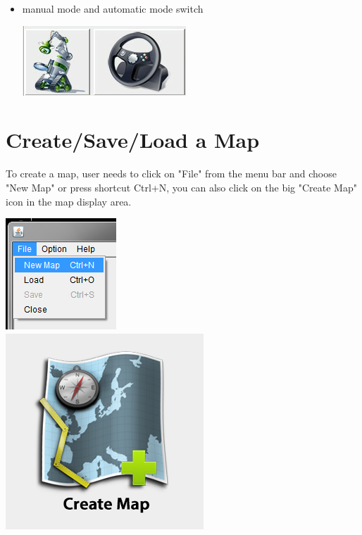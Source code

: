 \documentclass[11pt, a4paper]{report}
\begin{document}
\begin{itemize}
\begin{center}
	\end{center}
	\item manual mode and automatic mode switch
	\begin{center}
	\includegraphics[scale=0.7]{./image/Switch.png}\\[1cm]
	\end{center}
\end{itemize}

\section{Create/Save/Load a Map}


To create a map, user needs to click on "File" from the menu bar and choose "New Map" or press shortcut Ctrl+N, you can also click on the big "Create Map" icon in the map display area. \\
\begin{center}
\includegraphics[scale=1]{./image/NewMap.png}\\[0.5cm]
\includegraphics[scale=0.575]{./image/CreateMap.png}\\
\end{center}
\end{document}
